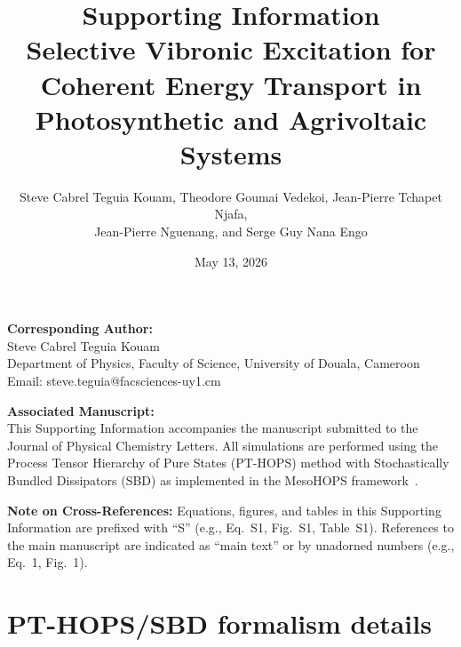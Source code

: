 \documentclass[11pt,a4paper]{article}
\begin{document}
\title{\textbf{Supporting Information}\\[0.5em]
\large Selective Vibronic Excitation for Coherent Energy Transport in Photosynthetic and Agrivoltaic Systems}

\author{Steve Cabrel Teguia Kouam, Theodore Goumai Vedekoi, Jean-Pierre Tchapet Njafa,\\ Jean-Pierre Nguenang, and Serge Guy Nana Engo}

\date{May 13, 2026}

\maketitle

\noindent\textbf{Corresponding Author:}\\
Steve Cabrel Teguia Kouam\\
Department of Physics, Faculty of Science, University of Douala, Cameroon\\
Email: steve.teguia@facsciences-uy1.cm

\vspace{1em}
\noindent\textbf{Associated Manuscript:}\\
This Supporting Information accompanies the manuscript submitted to the Journal of Physical Chemistry Letters. All simulations are performed using the Process Tensor Hierarchy of Pure States (PT-HOPS) method with Stochastically Bundled Dissipators (SBD) as implemented in the MesoHOPS framework~\cite{Varvelo2021,Citty2024}.

\tableofcontents

\newpage

\noindent\textbf{Note on Cross-References:} Equations, figures, and tables in this Supporting Information are prefixed with ``S'' (e.g., Eq.~S1, Fig.~S1, Table~S1). References to the main manuscript are indicated as ``main text'' or by unadorned numbers (e.g., Eq.~1, Fig.~1).

\vspace{1em}


\section{PT-HOPS/SBD formalism details}
\label{sec:formalism}
\end{document}
